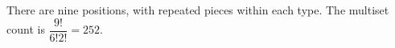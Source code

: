 There are nine positions, with repeated pieces within each type. The multiset count is $\dfrac{9!}{6!2!}=\boxed{252}$.
